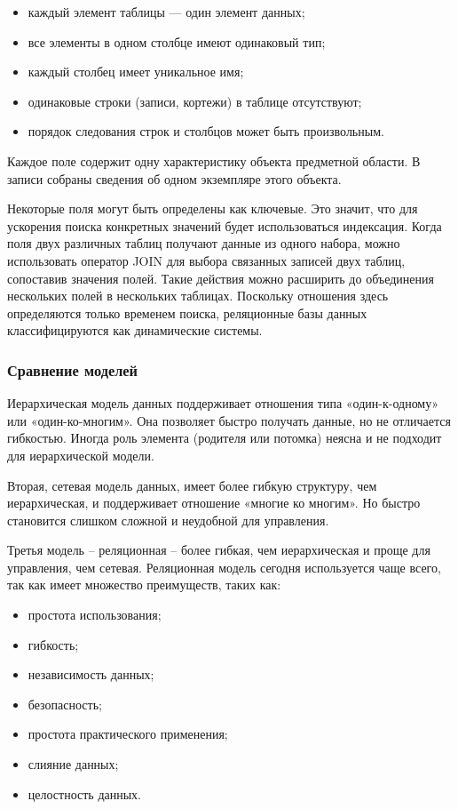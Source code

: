 \documentclass[a4paper, 14pt]{article}
\begin{document}
	\begin{itemize}
		\item каждый элемент таблицы — один элемент данных;
		\item все элементы в одном столбце имеют одинаковый тип;
		\item каждый столбец имеет уникальное имя;
		\item одинаковые строки (записи, кортежи) в таблице отсутствуют;
		\item порядок следования строк и столбцов может быть произвольным.
	\end{itemize}
	
	Каждое поле содержит одну характеристику объекта предметной области. В записи собраны сведения об одном экземпляре этого объекта.
	
	Некоторые поля могут быть определены как ключевые. Это значит, что для ускорения поиска конкретных значений будет использоваться индексация. Когда поля двух различных таблиц получают данные из одного набора, можно использовать оператор JOIN для выбора связанных записей двух таблиц, сопоставив значения полей. Такие действия можно расширить до объединения нескольких полей в нескольких таблицах. Поскольку отношения здесь определяются только временем поиска, реляционные базы данных классифицируются как динамические системы. 
	
	\subsubsection{Сравнение моделей}
	
	Иерархическая модель данных поддерживает отношения типа «один-к-одному» или «один-ко-многим». Она позволяет быстро получать данные, но не отличается гибкостью. Иногда роль элемента (родителя или потомка) неясна и не подходит для иерархической модели.
	
	Вторая, сетевая модель данных, имеет более гибкую структуру, чем иерархическая, и поддерживает отношение «многие ко многим». Но быстро становится слишком сложной и неудобной для управления.
	
	Третья модель – реляционная – более гибкая, чем иерархическая и проще для управления, чем сетевая. Реляционная модель сегодня используется чаще всего, так как имеет множество преимуществ, таких как:
	
	\begin{itemize}
		\item простота использования;
		\item гибкость;
		\item независимость данных;
		\item безопасность;
		\item простота практического применения;
		\item слияние данных;
		\item целостность данных.
	\end{itemize}
	
\end{document}
